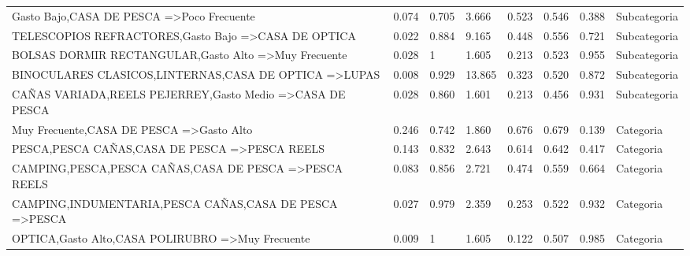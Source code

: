 \documentclass[]{article}
\begin{document}
\begin{landscape}
\begin{table}[htbp]
\begin{tabular}{llllllll}
				{Gasto Bajo,CASA DE PESCA} =\textgreater {Poco Frecuente} & 0.074 & 0.705 & 3.666 & 0.523 & 0.546 & 0.388 & Subcategoria \\
				{TELESCOPIOS REFRACTORES,Gasto Bajo} =\textgreater {CASA DE OPTICA} & 0.022 & 0.884 & 9.165 & 0.448 & 0.556 & 0.721 & Subcategoria \\
				{BOLSAS DORMIR RECTANGULAR,Gasto Alto} =\textgreater {Muy Frecuente} & 0.028 & 1     & 1.605 & 0.213 & 0.523 & 0.955 & Subcategoria \\
				{BINOCULARES CLASICOS,LINTERNAS,CASA DE OPTICA} =\textgreater {LUPAS} & 0.008 & 0.929 & 13.865 & 0.323 & 0.520 & 0.872 & Subcategoria \\
				{CAÑAS VARIADA,REELS PEJERREY,Gasto Medio} =\textgreater {CASA DE PESCA} & 0.028 & 0.860 & 1.601 & 0.213 & 0.456 & 0.931 & Subcategoria \\
				{Muy Frecuente,CASA DE PESCA} =\textgreater {Gasto Alto} & 0.246 & 0.742 & 1.860 & 0.676 & 0.679 & 0.139 & Categoria \\
				{PESCA,PESCA CAÑAS,CASA DE PESCA} =\textgreater {PESCA REELS} & 0.143 & 0.832 & 2.643 & 0.614 & 0.642 & 0.417 & Categoria \\
				{CAMPING,PESCA,PESCA CAÑAS,CASA DE PESCA} =\textgreater {PESCA REELS} & 0.083 & 0.856 & 2.721 & 0.474 & 0.559 & 0.664 & Categoria \\
				{CAMPING,INDUMENTARIA,PESCA CAÑAS,CASA DE PESCA} =\textgreater {PESCA} & 0.027 & 0.979 & 2.359 & 0.253 & 0.522 & 0.932 & Categoria \\
				{OPTICA,Gasto Alto,CASA POLIRUBRO} =\textgreater {Muy Frecuente} & 0.009 & 1     & 1.605 & 0.122 & 0.507 & 0.985 & Categoria \\
			\end{tabular}%
			\label{Tab_Reg_Anio}%
		\end{table}%
		
		
	\end{landscape}
	\restoregeometry
\end{document}
